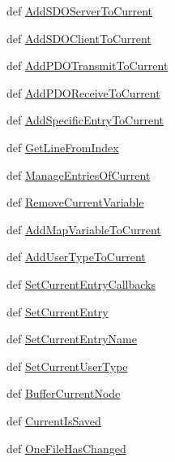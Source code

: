 \begin{CompactItemize}
\item 
def \hyperlink{classnodemanager_1_1NodeManager_a9bbd8bc45f3a992d7fdde208bacb2ff}{Add\-SDOServer\-To\-Current}
\item 
def \hyperlink{classnodemanager_1_1NodeManager_7910bb937cd4cf13906b0cd86505674c}{Add\-SDOClient\-To\-Current}
\item 
def \hyperlink{classnodemanager_1_1NodeManager_359cb64658d554454b8bfa18723f6f86}{Add\-PDOTransmit\-To\-Current}
\item 
def \hyperlink{classnodemanager_1_1NodeManager_dc455012736c8481f95ff1036deb8c0b}{Add\-PDOReceive\-To\-Current}
\item 
def \hyperlink{classnodemanager_1_1NodeManager_289765dcb04f19d8aba773c3ce2171c1}{Add\-Specific\-Entry\-To\-Current}
\item 
def \hyperlink{classnodemanager_1_1NodeManager_f3f718df6b3db1b68aee3c357cc722bd}{Get\-Line\-From\-Index}
\item 
def \hyperlink{classnodemanager_1_1NodeManager_735fa1347836ef9be64a1ed34876f451}{Manage\-Entries\-Of\-Current}
\item 
def \hyperlink{classnodemanager_1_1NodeManager_966a6a87de055ade4dc5f6aca08a307f}{Remove\-Current\-Variable}
\item 
def \hyperlink{classnodemanager_1_1NodeManager_3291a925caac3db1aec97aa8175a487e}{Add\-Map\-Variable\-To\-Current}
\item 
def \hyperlink{classnodemanager_1_1NodeManager_67c9ed379da322dc8db21b56395d6799}{Add\-User\-Type\-To\-Current}
\item 
def \hyperlink{classnodemanager_1_1NodeManager_dad0fbfe17b585712c0336ad71ec55d1}{Set\-Current\-Entry\-Callbacks}
\item 
def \hyperlink{classnodemanager_1_1NodeManager_7e9f5eccab23a7d2f7f7cb6f3e8fc92f}{Set\-Current\-Entry}
\item 
def \hyperlink{classnodemanager_1_1NodeManager_d0de3995c628b62448fe144651c019bb}{Set\-Current\-Entry\-Name}
\item 
def \hyperlink{classnodemanager_1_1NodeManager_ab2a81a217a4fa5bb8bb79e9991e9db4}{Set\-Current\-User\-Type}
\item 
def \hyperlink{classnodemanager_1_1NodeManager_bb79b2acd54ebcac7e97fae36b234b18}{Buffer\-Current\-Node}
\item 
def \hyperlink{classnodemanager_1_1NodeManager_df2cf6733f713115af3f75258f756e44}{Current\-Is\-Saved}
\item 
def \hyperlink{classnodemanager_1_1NodeManager_4e09d1ae59275bac43fb3462f945b2b7}{One\-File\-Has\-Changed}

\end{CompactItemize}
